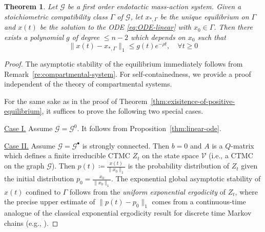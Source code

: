 \documentclass[10pt]{amsart}
\numberwithin{equation}{section}
\theoremstyle{plain}
\newtheorem{theorem}{Theorem}[section]
\theoremstyle{definition}
\theoremstyle{remark}
\newcommand{\cG}{\mathcal{G}}
\newcommand{\cV}{\mathcal{V}}
\begin{document}
\begin{theorem}\label{thm:deterministic-stability-endotactic}
Let $\cG$ be a first order endotactic mass-action system. Given  a stoichiometric compatibility class  $\Gamma$ of $\cG$, let $x_{*,\Gamma}$ be the unique equilibrium on $\Gamma$ and $x(t)$ be the solution to the ODE \eqref{eq:ODE-linear} with $x_0\in\Gamma$. Then there exists a polynomial $g$ of degree $\le n-2$ which depends on $x_0$ such that
\[\|x(t)-x_{*,\Gamma}\|_1\le g(t) e^{-\rho t},\quad \forall t\ge0\]
\end{theorem}
\begin{proof}
{The asymptotic stability of the equilibrium immediately follows from Remark~\ref{re:compartmental-system}. For self-containedness, we provide a proof independent of the theory of compartmental systems.}


For the same sake as in the proof of Theorem~\ref{thm:exisitence-of-positive-equilibrium}, it suffices to prove the following two special cases.
\medskip

\noindent\underline{Case I.} Assume $\cG=\cG^0$. It follows from Proposition~\ref{thm:linear-ode}.
\medskip

\noindent\underline{Case II.} Assume $\cG=\cG^{\bullet}$    is strongly connected. Then $b=0$ and $A$ is a $Q$-matrix which defines a finite irreducible CTMC  $Z_t$ on the state space $\cV$ (i.e., a CTMC on the graph $\cG$). Then $p(t)\coloneqq\frac{x(t)}{\|x_0\|_1}$ is the probability distribution of $Z_t$ given the initial distribution $p_0=\frac{x_0}{\|x_0\|_1}$. The  exponential global asymptotic stability of $x(t)$ confined to $\Gamma$ follows from the \emph{uniform exponential ergodicity} of $Z_t$, where the precise upper estimate of $\|p(t)-p_0\|_1$ comes from a continuous-time analogue of the classical exponential ergodicity result for discrete time Markov chains (e.g., \cite[Theorem~5.3]{J13}).
\end{proof}
\end{document}
